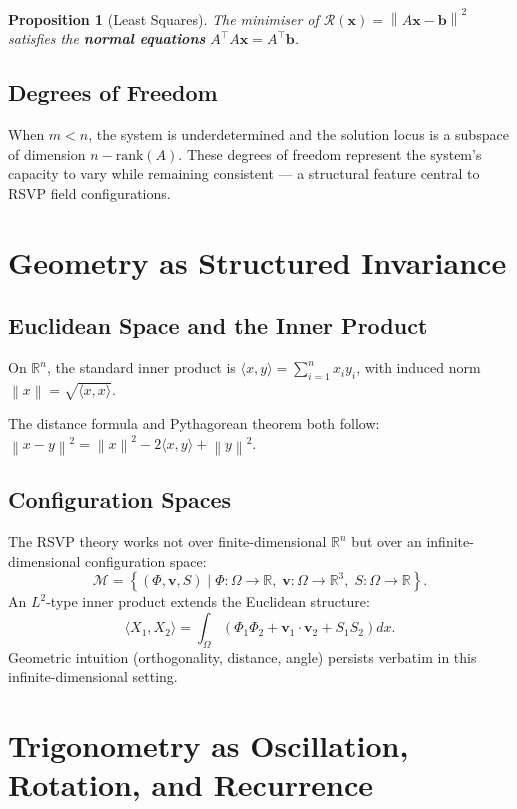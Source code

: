 \documentclass[11pt, openany]{book}
\theoremstyle{plain}
\newtheorem{proposition}[theorem]{Proposition}
\theoremstyle{definition}
\theoremstyle{remark}
\newcommand{\R}{\mathbb{R}}
\newcommand{\norm}[1]{\left\lVert#1\right\rVert}
\begin{document}
\begin{proposition}[Least Squares]
The minimiser of $\mathcal{R}(\mathbf{x})=\norm{A\mathbf{x}-\mathbf{b}}^2$
satisfies the \textbf{normal equations} $A^\top A\mathbf{x}=A^\top\mathbf{b}$.
\end{proposition}

\section{Degrees of Freedom}

When $m<n$, the system is underdetermined and the solution locus is a
subspace of dimension $n-\mathrm{rank}(A)$. These degrees of freedom
represent the system's capacity to vary while remaining consistent ---
a structural feature central to RSVP field configurations.

\chapter{Geometry as Structured Invariance}

\section{Euclidean Space and the Inner Product}

On $\R^n$, the standard inner product is
$\langle x,y\rangle=\sum_{i=1}^n x_iy_i$,
with induced norm $\norm{x}=\sqrt{\langle x,x\rangle}$.

The distance formula and Pythagorean theorem both follow:
$\norm{x-y}^2=\norm{x}^2-2\langle x,y\rangle+\norm{y}^2$.

\section{Configuration Spaces}

The RSVP theory works not over finite-dimensional $\R^n$ but over an
infinite-dimensional configuration space:
\[
  \mathcal{M}=\left\{(\Phi,\mathbf{v},S)\mid
  \Phi:\Omega\to\R,\;\mathbf{v}:\Omega\to\R^3,\;S:\Omega\to\R\right\}.
\]
An $L^2$-type inner product extends the Euclidean structure:
\[
  \langle X_1,X_2\rangle=
  \int_\Omega\!\left(\Phi_1\Phi_2+\mathbf{v}_1\cdot\mathbf{v}_2+S_1S_2\right)dx.
\]
Geometric intuition (orthogonality, distance, angle) persists verbatim in this
infinite-dimensional setting.

\chapter{Trigonometry as Oscillation, Rotation, and Recurrence}
\end{document}
